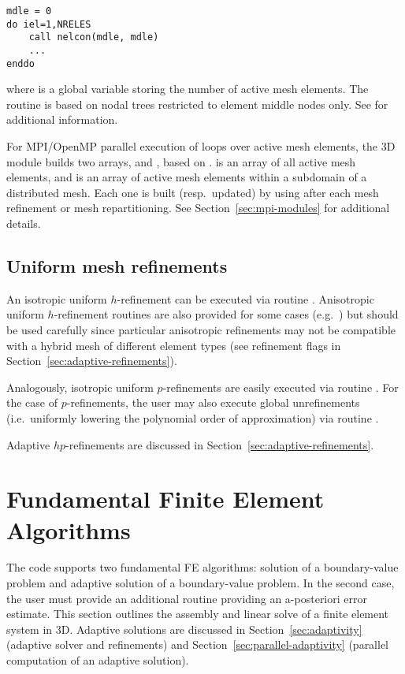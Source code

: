 \begin{lstlisting}[caption=Loop over active mesh elements., label={lst:loop_active_mesh_elements}]
mdle = 0
do iel=1,NRELES
	call nelcon(mdle, mdle)
	...
enddo
\end{lstlisting}

where  is a global variable storing the number of active mesh elements. The  routine is based on nodal trees restricted to element middle nodes only. See \cite{hpbook,hpbook2} for additional information.

\begin{remark}
For MPI/OpenMP parallel execution of loops over active mesh elements, the \hp3D  module builds two arrays,  and , based on .  is an array of all active mesh elements, and  is an array of active mesh elements within a subdomain of a distributed mesh. Each one is built (resp.~updated) by using  after each mesh refinement or mesh repartitioning. See Section~\ref{sec:mpi-modules} for additional details.
\end{remark}


\subsection{Uniform mesh refinements}
\label{subsec:uniform-refinements}

An isotropic uniform $h$-refinement can be executed via routine . Anisotropic uniform $h$-refinement routines are also provided for some cases (e.g.~) but should be used carefully since particular anisotropic refinements may not be compatible with a hybrid mesh of different element types (see refinement flags in Section~\ref{sec:adaptive-refinements}).

Analogously, isotropic uniform $p$-refinements are easily executed via routine . For the case of $p$-refinements, the user may also execute global unrefinements (i.e.~uniformly lowering the polynomial order of approximation) via routine .

Adaptive $hp$-refinements are discussed in Section~\ref{sec:adaptive-refinements}.

\section{Fundamental Finite Element Algorithms}
\label{sec:FE_algorithms}
The code supports two fundamental FE algorithms: solution of a boundary-value problem and adaptive solution of a boundary-value problem. In the second case, the user must provide an additional routine providing an a-posteriori error estimate. This section outlines the assembly and linear solve of a finite element system in \hp3D. Adaptive solutions are discussed in Section~\ref{sec:adaptivity} (adaptive solver and refinements) and Section~\ref{sec:parallel-adaptivity} (parallel computation of an adaptive solution).

